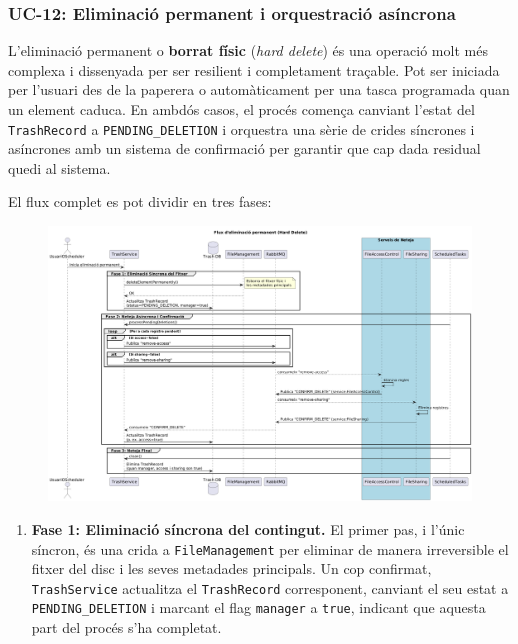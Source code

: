 \subsubsection{UC-12: Eliminació permanent i orquestració asíncrona}

L'eliminació permanent o \textbf{borrat físic} (\textit{hard delete}) és una operació molt més complexa i dissenyada per ser resilient i completament traçable. Pot ser iniciada per l'usuari des de la paperera o automàticament per una tasca programada quan un element caduca. En ambdós casos, el procés comença canviant l'estat del \texttt{TrashRecord} a \texttt{PENDING\_DELETION} i orquestra una sèrie de crides síncrones i asíncrones amb un sistema de confirmació per garantir que cap dada residual quedi al sistema.

El flux complet es pot dividir en tres fases:

\begin{figure}[H]
    \centering
    \includegraphics[width=\textwidth]{Figures/flux/permanent_delete_files.png}
\end{figure}

\begin{enumerate}
    \item \textbf{Fase 1: Eliminació síncrona del contingut.} El primer pas, i l'únic síncron, és una crida a \texttt{FileManagement} per eliminar de manera irreversible el fitxer del disc i les seves metadades principals. Un cop confirmat, \texttt{TrashService} actualitza el \texttt{TrashRecord} corresponent, canviant el seu estat a \texttt{PENDING\_DELETION} i marcant el flag \texttt{manager} a \texttt{true}, indicant que aquesta part del procés s'ha completat.
\end{enumerate}

